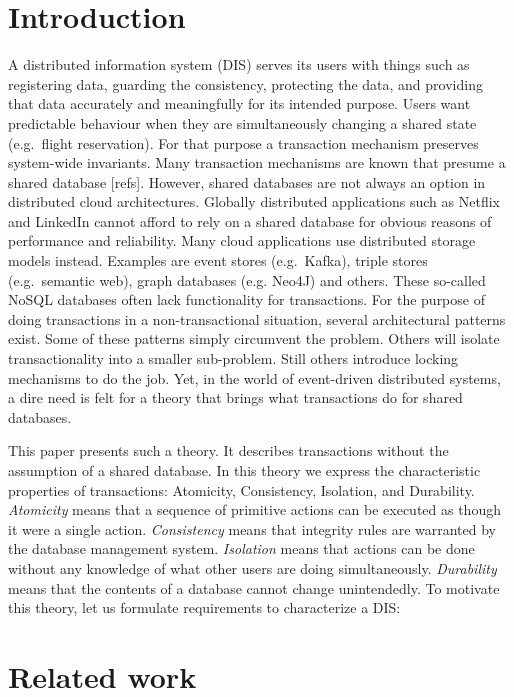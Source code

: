 \documentclass{elsarticle}
\begin{document}
\section{Introduction}
\label{sct:Introduction}
	A distributed information system (DIS) serves its users with things such as
	registering data, guarding the consistency, protecting the data,
	and providing that data accurately and meaningfully for its intended purpose.
	Users want predictable behaviour when they are simultaneously changing a shared state (e.g.\ flight reservation).
	For that purpose a transaction mechanism preserves system-wide invariants.
	Many transaction mechanisms are known that presume a shared database [refs].
	However, shared databases are not always an option in distributed cloud architectures.
	Globally distributed applications such as Netflix and LinkedIn cannot afford to rely on a shared database for obvious reasons of performance and reliability.
	Many cloud applications use distributed storage models instead.
	Examples are event stores (e.g.\ Kafka), triple stores (e.g.\ semantic web), graph databases (e.g. Neo4J) and others.
	These so-called NoSQL databases often lack functionality for transactions.
	For the purpose of doing transactions in a non-transactional situation, several architectural patterns exist.
	Some of these patterns simply circumvent the problem.
	Others will isolate transactionality into a smaller sub-problem.
	Still others introduce locking mechanisms to do the job.
	Yet, in the world of event-driven distributed systems, a dire need is felt for a theory that brings what transactions do for shared databases.
	
	This paper presents such a theory.
	It describes transactions without the assumption of a shared database.
	In this theory we express the characteristic properties of transactions: Atomicity, Consistency, Isolation, and Durability.
	{\em Atomicity} means that a sequence of primitive actions can be executed as though it were a single action.
	{\em Consistency} means that integrity rules are warranted by the database management system.
	{\em Isolation} means that actions can be done without any knowledge of what other users are doing simultaneously.
	{\em Durability} means that the contents of a database cannot change unintendedly.
	To motivate this theory, let us formulate requirements to characterize a DIS:

\section{Related work}
\label{sct:Related work}
\cite{Foster17c}
\end{document}
